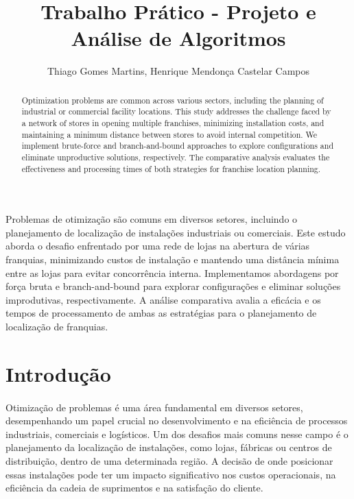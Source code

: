 \documentclass[12pt]{article}
\title{Trabalho Prático - Projeto e Análise de Algoritmos}
\author{Thiago Gomes Martins, Henrique Mendonça Castelar Campos}
\begin{document}
 
\maketitle

\begin{abstract}
  Optimization problems are common across various sectors, including the planning of industrial or commercial facility locations. This study addresses the challenge faced by a network of stores in opening multiple franchises, minimizing installation costs, and maintaining a minimum distance between stores to avoid internal competition. We implement brute-force and branch-and-bound approaches to explore configurations and eliminate unproductive solutions, respectively. The comparative analysis evaluates the effectiveness and processing times of both strategies for franchise location planning.
\end{abstract}
     
\begin{resumo} 
  Problemas de otimização são comuns em diversos setores, incluindo o planejamento de localização de instalações industriais ou comerciais. Este estudo aborda o desafio enfrentado por uma rede de lojas na abertura de várias franquias, minimizando custos de instalação e mantendo uma distância mínima entre as lojas para evitar concorrência interna. Implementamos abordagens por força bruta e branch-and-bound para explorar configurações e eliminar soluções improdutivas, respectivamente. A análise comparativa avalia a eficácia e os tempos de processamento de ambas as estratégias para o planejamento de localização de franquias.
\end{resumo}


\section{Introdução}

\paragraph{}Otimização de problemas é uma área fundamental em diversos setores, desempenhando um papel crucial no desenvolvimento e na eficiência de processos industriais, comerciais e logísticos. Um dos desafios mais comuns nesse campo é o planejamento da localização de instalações, como lojas, fábricas ou centros de distribuição, dentro de uma determinada região. A decisão de onde posicionar essas instalações pode ter um impacto significativo nos custos operacionais, na eficiência da cadeia de suprimentos e na satisfação do cliente.
\end{document}
